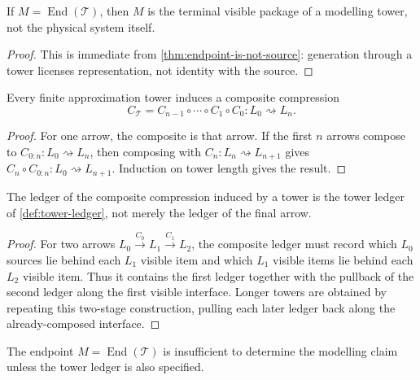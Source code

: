 \begin{corollary}
\label{cor:model-as-terminal-package}
If $M=\operatorname{End}(\mathcal T)$, then $M$ is the terminal visible package of a modelling tower, not the physical system itself.
\end{corollary}

\begin{proof}
This is immediate from \autoref{thm:endpoint-is-not-source}: generation through a tower licenses representation, not identity with the source.
\end{proof}

\begin{theorem}
\label{thm:tower-induces-composite-compression}
Every finite approximation tower induces a composite compression
$$
C_{\mathcal T}
=
C_{n-1}\circ\cdots\circ C_1\circ C_0
:
L_0\rightsquigarrow L_n.
$$
\end{theorem}

\begin{proof}
For one arrow, the composite is that arrow. If the first $n$ arrows compose to $C_{0:n}:L_0\rightsquigarrow L_n$, then composing with $C_n:L_n\rightsquigarrow L_{n+1}$ gives $C_n\circ C_{0:n}:L_0\rightsquigarrow L_{n+1}$. Induction on tower length gives the result.
\end{proof}

\begin{theorem}
\label{thm:tower-ledger-is-composite}
The ledger of the composite compression induced by a tower is the tower ledger of \autoref{def:tower-ledger}, not merely the ledger of the final arrow.
\end{theorem}

\begin{proof}
For two arrows $L_0\xrightarrow{C_0}L_1\xrightarrow{C_1}L_2$, the composite ledger must record which $L_0$ sources lie behind each $L_1$ visible item and which $L_1$ visible items lie behind each $L_2$ visible item. Thus it contains the first ledger together with the pullback of the second ledger along the first visible interface. Longer towers are obtained by repeating this two-stage construction, pulling each later ledger back along the already-composed interface.
\end{proof}

\begin{corollary}
\label{cor:endpoint-alone-insufficient}
The endpoint $M=\operatorname{End}(\mathcal T)$ is insufficient to determine the modelling claim unless the tower ledger is also specified.
\end{corollary}

